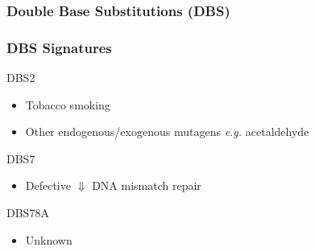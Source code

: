 \documentclass{beamer}
\begin{document}
    \subsubsection{Double Base Substitutions (DBS)}
    \begin{frame}[allowframebreaks]
        \frametitle{DBS Signatures}

        \begin{block}{DBS2}
            \begin{itemize}
                \item Tobacco smoking \cite{signature6}
                \item Other endogenous/exogenous mutagens \textit{e.g.} acetaldehyde
            \end{itemize}
        \end{block}

        \begin{block}{DBS7}
            \begin{itemize}
                \item Defective $\Downarrow$ DNA mismatch repair \cite{signature1}
            \end{itemize}
        \end{block}

        \begin{block}{DBS78A}
            \begin{itemize}
                \item Unknown
            \end{itemize}
        \end{block}
    \end{frame}
\end{document}
